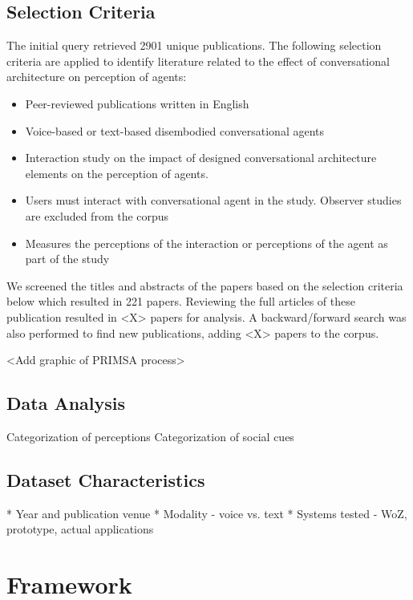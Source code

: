 \documentclass[sigconf,screen,review, anonymous]{acmart}
\begin{document}
\subsection{Selection Criteria}
The initial query retrieved 2901 unique publications. The following selection criteria are applied to identify literature related to the effect of conversational architecture on perception of agents:
\begin{itemize}
  \item Peer-reviewed publications written in English
  \item Voice-based or text-based disembodied conversational agents
  \item Interaction study on the impact of designed conversational architecture elements on the perception of agents.
  \item Users must interact with conversational agent in the study. Observer studies are excluded from the corpus
  \item Measures the perceptions of the interaction or perceptions of the agent as part of the study
\end{itemize}

We screened the titles and abstracts of the papers based on the selection criteria below which resulted in 221 papers. Reviewing the full articles of these publication resulted in <X> papers for analysis. A backward/forward search was also performed to find new publications, adding <X> papers to the corpus.

<Add graphic of PRIMSA process>

\subsection{Data Analysis}

Categorization of perceptions \newline
Categorization of social cues \newline

\subsection{Dataset Characteristics}
* Year and publication venue
\newline
* Modality - voice vs. text
\newline
* Systems tested - WoZ, prototype, actual applications

\section{Framework}
\end{document}
